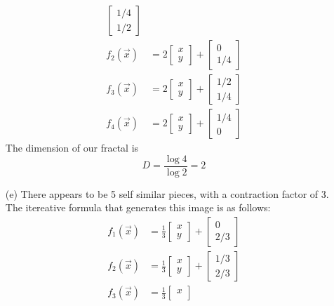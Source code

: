 \documentclass[12pt]{article}
\begin{document}
\begin{itemize}
\begin{align*}
\begin{bmatrix}
			1/4 \\
			1/2
		\end{bmatrix} \\
		f_2(\vec{x}) &= 2 \begin{bmatrix}
			x \\
			y
		\end{bmatrix} + \begin{bmatrix}
			0 \\
			1/4
		\end{bmatrix} \\
		f_3(\vec{x}) &= 2 \begin{bmatrix}
			x \\
			y
		\end{bmatrix} + \begin{bmatrix}
			1/2 \\
			1/4
		\end{bmatrix} \\
		f_4(\vec{x}) &= 2 \begin{bmatrix}
			x \\
			y
		\end{bmatrix} + \begin{bmatrix}
			1/4 \\
			0
		\end{bmatrix} 
	\end{align*}
	The dimension of our fractal is
	\[
		D = \frac{\log 4}{\log 2} = 2
	\]
	\item[(e)] There appears to be 5 self similar pieces, with a contraction factor of 3. The itereative formula that generates this image is as follows:
	\begin{align*}
		f_1(\vec{x}) &= \frac{1}{3} \begin{bmatrix}
			x \\
			y
		\end{bmatrix} + \begin{bmatrix}
			0 \\
			2/3
		\end{bmatrix} \\
		f_2(\vec{x}) &= \frac{1}{3} \begin{bmatrix}
			x \\
			y
		\end{bmatrix} + \begin{bmatrix}
			1/3 \\
			2/3
		\end{bmatrix} \\
		f_3(\vec{x}) &= \frac{1}{3} \begin{bmatrix}
			x \\

\end{bmatrix}
\end{align*}
\end{itemize}
\end{document}
